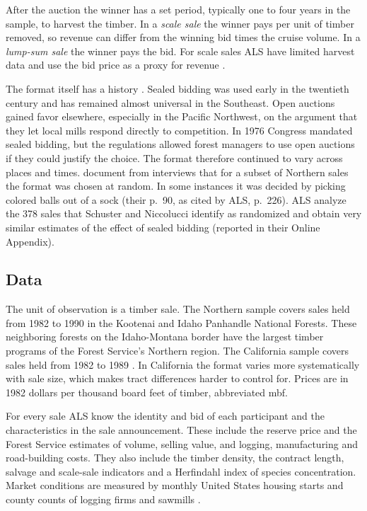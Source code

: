 After the auction the winner has a set period, typically one to four years in the sample, to harvest
the timber. In a \emph{scale sale} the winner pays per unit of timber removed, so revenue can
differ from the winning bid times the cruise volume. In a \emph{lump-sum sale} the winner pays the bid.
For scale sales ALS have limited harvest data and use the bid price as a proxy for revenue
\citep[p.~219]{AtheyLevinSeira2011}.

The format itself has a history \citep[pp.~210 and 221--226]{AtheyLevinSeira2011}. Sealed bidding
was used early in the twentieth century and has remained almost universal in the Southeast. Open
auctions gained favor elsewhere, especially in the Pacific Northwest, on the argument that they let
local mills respond directly to competition. In 1976 Congress mandated sealed bidding, but the
regulations allowed forest managers to use open auctions if they could justify the choice. The format
therefore continued to vary across places and times. \citet{SchusterNiccolucci1994} document from
interviews that for a subset of Northern sales the format was chosen at random. In some instances it
was decided by picking colored balls out of a sock (their p.~90, as cited by ALS, p.~226). ALS analyze
the 378 sales that Schuster and Niccolucci identify as randomized and obtain very similar estimates of
the effect of sealed bidding (reported in their Online Appendix).

\subsection{Data}\label{sec:15-als-data}

The unit of observation is a timber sale. The Northern sample covers sales held from 1982 to 1990 in the
Kootenai and Idaho Panhandle National Forests. These neighboring forests on the Idaho-Montana border have
the largest timber programs of the Forest Service's Northern region. The California sample covers sales
held from 1982 to 1989 \citep[p.~218]{AtheyLevinSeira2011}. In California the format varies more
systematically with sale size, which makes tract differences harder to control for. Prices are in 1982
dollars per thousand board feet of timber, abbreviated mbf.

For every sale ALS know the identity and bid of each participant and the characteristics in the sale
announcement. These include the reserve price and the Forest Service estimates of volume, selling value,
and logging, manufacturing and road-building costs. They also include the timber density, the contract
length, salvage and scale-sale indicators and a Herfindahl index of species concentration. Market conditions are measured
by monthly United States housing starts and county counts of logging firms and sawmills
\citep[p.~226]{AtheyLevinSeira2011}.

